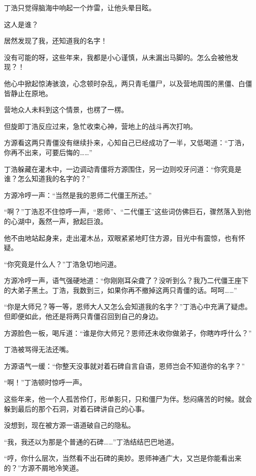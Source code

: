 
\begin{this_body}

丁浩只觉得脑海中响起一个炸雷，让他头晕目眩。

这人是谁？

居然发现了我，还知道我的名字！

没有可能的呀，这些年来，我都是小心谨慎，从未漏出马脚的。怎么会被他发现？！

他心中掀起惊涛骇浪，心念顿时杂乱，两只青毛僵尸，以及营地周围的黑僵、白僵皆静止在原地。

营地众人未料到这个情景，也楞了一楞。

但旋即丁浩反应过来，急忙收束心神，营地上的战斗再次打响。

方源看这两只青僵没有继续扑来，心知自己已经成功了一半，又低喝道：“丁浩，你再不出来，可要后悔的……”

丁浩躲藏在灌木中，一边调动青僵将方源围住，另一边则咬牙问道：“你究竟是谁？怎么知道我的名字的？”

方源冷哼一声：“当然是我的恩师二代僵王所述。”

“啊？”丁浩忍不住惊呼一声，“恩师”、“二代僵王”这些词仿佛巨石，骤然落入到他的心湖中，轰然一声，掀起巨浪。

他不由地站起身来，走出灌木丛，双眼紧紧地盯住方源，目光中有震惊，也有怀疑。

“你究竟是什么人？”丁浩急切地问道。

方源冷哼一声，语气强硬地道：“你刚刚耳朵聋了？没听到么？我乃二代僵王座下的大弟子黑土。丁浩，我数到三，如果你再不撤掉这两只青僵的话。呵呵……”

“你是大师兄？等一等，恩师大人又怎么会知道我的名字？”丁浩心中充满了疑虑。但即便如此，他还是将两只青僵召回到自己的身边。

方源脸色一板，喝斥道：“谁是你大师兄？恩师还未收你做弟子，你瞎咋呼什么？”

丁浩被骂得无法还嘴。

方源语气一缓：“你整天没事就对着石碑自言自语，恩师岂会不知道你的名字？”

“啊！”丁浩顿时惊呼一声。

这些年来，他一个人孤苦伶仃，形单影只，只和僵尸为伴。愁闷痛苦的时候。就会躲到最后的那个石洞，对着石碑讲自己的心事。

没想到，现在被方源一语道破自己的隐私。

“我，我还以为那是个普通的石碑……”丁浩结结巴巴地道。

“哼，你什么层次，当然看不出石碑的奥妙。恩师神通广大，又岂是你能看出来的？”方源不屑地冷笑道。


\end{this_body}
